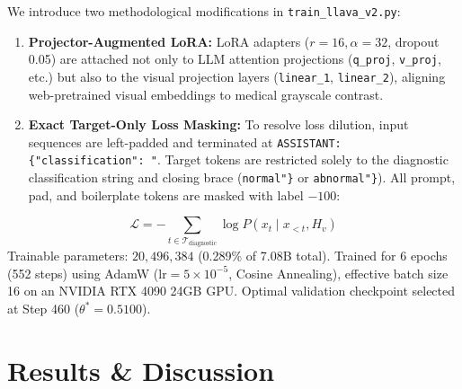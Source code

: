 \documentclass[conference]{IEEEtran}
\begin{document}
We introduce two methodological modifications in \texttt{train\_llava\_v2.py}:
\begin{enumerate}
    \item \textbf{Projector-Augmented LoRA:} LoRA adapters ($r=16, \alpha=32$, dropout 0.05) are attached not only to LLM attention projections (\texttt{q\_proj}, \texttt{v\_proj}, etc.) but also to the visual projection layers (\texttt{linear\_1}, \texttt{linear\_2}), aligning web-pretrained visual embeddings to medical grayscale contrast.
    \item \textbf{Exact Target-Only Loss Masking:} To resolve loss dilution, input sequences are left-padded and terminated at \texttt{ASSISTANT: \{"classification": "}. Target tokens are restricted solely to the diagnostic classification string and closing brace (\texttt{normal"\}} or \texttt{abnormal"\}}). All prompt, pad, and boilerplate tokens are masked with label $-100$:
\end{enumerate}
\begin{equation}
\mathcal{L} = -\sum_{t \in \mathcal{T}_{\text{diagnostic}}} \log P(x_t \mid x_{<t}, H_v)
\end{equation}
Trainable parameters: $20,496,384$ (0.289\% of 7.08B total). Trained for 6 epochs (552 steps) using AdamW ($\text{lr} = 5\times 10^{-5}$, Cosine Annealing), effective batch size 16 on an NVIDIA RTX 4090 24GB GPU. Optimal validation checkpoint selected at Step 460 ($\theta^* = 0.5100$).

\section{Results \& Discussion}
\end{document}
